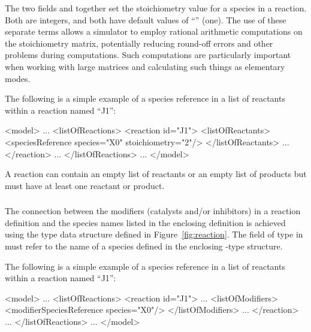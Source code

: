 \documentclass[10pt,twocolumntoc]{cekarticle}
\newcommand{\vref}[1]{\ref{#1}}
\begin{document}
The two fields  and 
together set the stoichiometry value for a species in a reaction.
Both are integers, and both have default values of
``'' (one).  The use of these separate terms allows
a simulator to employ rational arithmetic computations on the
stoichiometry matrix, potentially reducing round-off errors and
other problems during computations.  Such computations are
particularly important when working with large matrices and
calculating such things as elementary modes.

The following is a simple example of a species reference in a list
of reactants within a reaction named ``J1'':
\begin{example}
<model>
    ...
    <listOfReactions>
        <reaction id="J1">
            <listOfReactants>
                <speciesReference species="X0" stoichiometry="2"/>
            </listOfReactants>
            ...
        </reaction>
        ...
    </listOfReactions>
    ...
</model>
\end{example}

A reaction can contain an empty list of reactants or an empty list
of products but must have at least one reactant or product.

\subsubsection{}
\label{subsec:modifierreference}

The connection between the modifiers (catalysts and/or inhibitors)
in a reaction definition and the species names listed in the
enclosing  definition is achieved using the
 type data structure defined in
Figure~\vref{fig:reaction}. The field  of type
 in  must refer to the
name of a species defined in the enclosing -type
structure.

The following is a simple example of a species reference in a list
of reactants within a reaction named ``J1'':
\begin{example}
<model>
    ...
    <listOfReactions>
        <reaction id="J1">
            ...
            <listOfModifiers>
                <modifierSpeciesReference species="X0"/>
            </listOfModifiers>
            ...
        </reaction>
        ...
    </listOfReactions>
    ...
</model>
\end{example}
\end{document}

